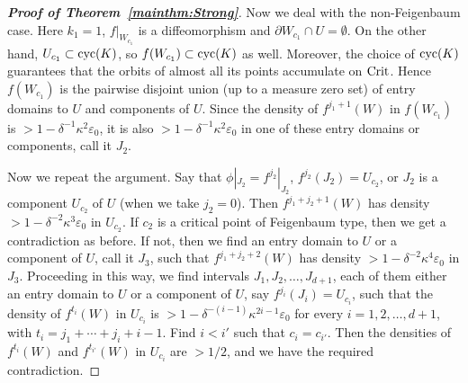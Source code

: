 \documentclass[12pt, psamsfonts, reqno]{amsart}
\begin{document}
\begin{proof}[\textbf{Proof of Theorem~\ref{mainthm:Strong}}]
Now we deal with the non-Feigenbaum case. Here $k_1=1$,
$f|_{W_{c_1}}$ is a diffeomorphism and $\partial W_{c_1}\cap
U=\emptyset$. On the other hand, $U_{c_1}\subset {\mathop{\rm cyc}\nolimits}(K)$, so
$f(W_{c_1})\subset {\mathop{\rm cyc}\nolimits}(K)$ as well. Moreover, the choice of
${\mathop{\rm cyc}\nolimits}(K)$ guarantees that the orbits of almost all its points
accumulate on ${\mathop{\rm Crit}\nolimits}$. Hence $f(W_{c_1})$ is the pairwise disjoint
union (up to a measure zero set) of entry domains to $U$ and
components of $U$. Since the density of $f^{j_1+1}(W)$ in
$f(W_{c_1})$ is $>1-\delta^{-1}\kappa^2{\varepsilon}_0$, it is also
$>1-\delta^{-1}\kappa^2{\varepsilon}_0$ in one of these entry domains or
components, call it $J_2$.

Now we repeat the argument. Say that $\phi|_{J_2}=f^{j_2}|_{J_2}$,
$f^{j_2}(J_2)=U_{c_2}$, or $J_2$ is a component $U_{c_2}$ of $U$
(when we take $j_2=0$). Then $f^{j_1+j_2+1}(W)$ has density
$>1-\delta^{-2}\kappa^3{\varepsilon}_0$ in $U_{c_2}$. If $c_2$ is a
critical point of Feigenbaum type, then we get a contradiction as
before. If not, then we find an entry domain to $U$ or a component
of $U$, call it $J_3$, such that $f^{j_1+j_2+2}(W)$ has density
$>1-\delta^{-2}\kappa^4{\varepsilon}_0$ in $J_3$. Proceeding in this way,
we find intervals $J_1,J_2,\ldots, J_{d+1}$, each of them either
an entry domain to $U$ or a component of $U$, say
$f^{j_i}(J_i)=U_{c_i}$, such that the density of $f^{t_i}(W)$ in
$U_{c_i}$ is $>1-\delta^{-(i-1)}\kappa^{2i-1}{\varepsilon}_0$ for every
$i=1,2,\ldots, d+1$, with $t_i=j_1+\cdots+j_i+i-1$. Find $i<i'$
such that $c_{i}=c_{i'}$. Then the densities of $f^{t_i}(W)$ and
$f^{t_{i'}}(W)$ in $U_{c_i}$ are $>1/2$, and we have the required
contradiction.
\end{proof}

\end{document}
